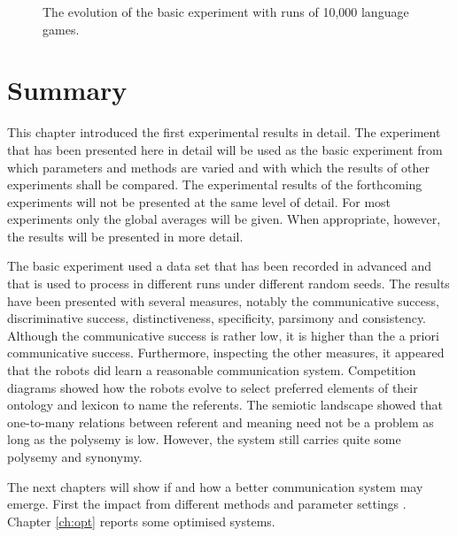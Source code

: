 \begin{figure}[H]
\centering
{}
\caption{The evolution of the basic experiment with runs of 10,000 language games.}
\label{f:st:10000}
\end{figure}


\section{Summary}\label{basic:summary}

This chapter introduced the first experimental results in detail. The experiment that has been presented here in detail will be used as the basic experiment from which parameters and methods are varied and with which the results of other experiments shall be compared. The experimental results of the forthcoming experiments will not be presented at the same level of detail. For most experiments only the global averages will be given. When appropriate, however, the results will be presented in more detail. 

The basic experiment used a data set that has been recorded in advanced  and that is used to process in different runs under different random seeds. The results have been presented with several measures, notably the communicative success, discriminative success, distinctiveness, specificity, parsimony and consistency. Although the communicative success is rather low, it is higher than the a priori communicative success. Furthermore, inspecting the other measures, it appeared that the robots did learn a reasonable communication system. Competition diagrams showed how the robots evolve to select preferred elements of their ontology and lexicon to name the referents. The semiotic landscape showed that one-to-many relations between referent and meaning need not be a problem as long as the polysemy is low.  However, the system still carries quite some polysemy and synonymy. 

The next chapters will show if and how a better communication system may emerge. First the impact from different methods and parameter settings . Chapter \ref{ch:opt} reports some optimised systems.